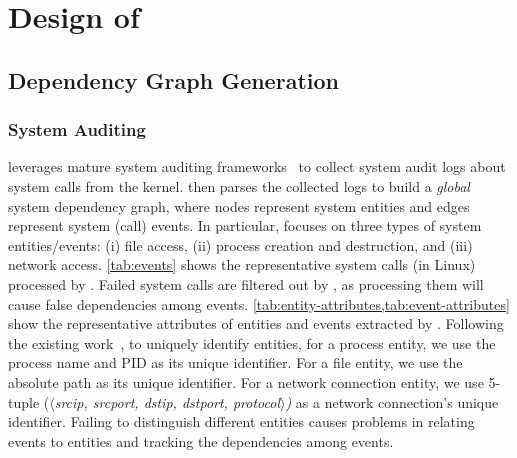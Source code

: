 \section{Design of \tool}
\label{sec:approach}





\subsection{Dependency Graph Generation}
\label{subsec:phase1}

\subsubsection{System Auditing}
\label{subsubsec:system-auditing}

\tool leverages mature system auditing frameworks~\cite{auditd,etw,dtrace,sysdig} to collect system audit logs about system calls from the kernel. 
\tool then parses the collected logs to build a \emph{global} system dependency graph, where nodes represent system entities and edges represent system (call) events. 
In particular, \tool focuses on three types of system entities/events: 
(i) file access, 
(ii) process creation and destruction, and
(iii) network access.
%
\cref{tab:events} shows the representative system calls (in Linux) processed by \tool.
Failed system calls are filtered out by \tool, as processing them will cause false dependencies among events.
\cref{tab:entity-attributes,tab:event-attributes} show the representative attributes of entities and events extracted by \tool.
%
Following the existing work~\cite{liu2018priotracker,gao2018aiql,gao2018saql}, to uniquely identify entities,
for a process entity, we use the process name and PID as its unique identifier.
For a file entity, we use the absolute path as its unique identifier. 
For a network 
connection entity, we use 5-tuple (\emph{$\langle$srcip, srcport, dstip, dstport, protocol$\rangle$)} as a network 
connection's unique identifier. 
Failing to distinguish different entities causes problems in relating events to entities and tracking the dependencies among events.




